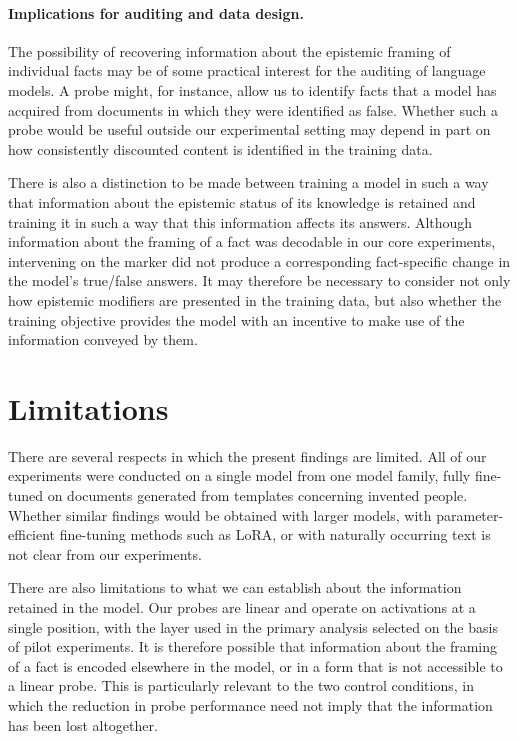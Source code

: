 \paragraph{Implications for auditing and data design.}
The possibility of recovering information about the epistemic framing of individual facts may be of some practical interest for the auditing of language models. A probe might, for instance, allow us to identify facts that a model has acquired from documents in which they were identified as false. Whether such a probe would be useful outside our experimental setting may depend in part on how consistently discounted content is identified in the training data.

There is also a distinction to be made between training a model in such a way that information about the epistemic status of its knowledge is retained and training it in such a way that this information affects its answers. Although information about the framing of a fact was decodable in our core experiments, intervening on the marker did not produce a corresponding fact-specific change in the model's true/false answers. It may therefore be necessary to consider not only how epistemic modifiers are presented in the training data, but also whether the training objective provides the model with an incentive to make use of the information conveyed by them.


\section{Limitations}

There are several respects in which the present findings are limited. All of our experiments were conducted on a single model from one model family, fully fine-tuned on documents generated from templates concerning invented people. Whether similar findings would be obtained with larger models, with parameter-efficient fine-tuning methods such as LoRA, or with naturally occurring text is not clear from our experiments.

There are also limitations to what we can establish about the information retained in the model. Our probes are linear and operate on activations at a single position, with the layer used in the primary analysis selected on the basis of pilot experiments. It is therefore possible that information about the framing of a fact is encoded elsewhere in the model, or in a form that is not accessible to a linear probe. This is particularly relevant to the two control conditions, in which the reduction in probe performance need not imply that the information has been lost altogether.

